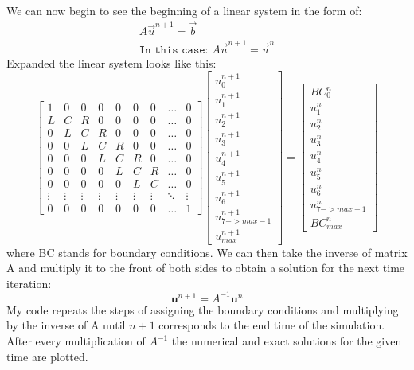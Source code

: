 \documentclass[12pt]{article}
\begin{document}
We can now begin to see the beginning of a linear system in the form of:
\begin{equation}
\begin{aligned}
A\vec{u}^{n+1}=\vec{b} \\
\texttt{In this case: } A\vec{u}^{n+1}=\vec{u}^n
\end{aligned}
\end{equation}
Expanded the linear system looks like this:
\[
\begin{bmatrix}
 1 & 0 & 0 & 0 & 0 & 0 & 0 & \dots & 0 \\
 L & C & R & 0 & 0 & 0 & 0 & \dots & 0 \\
 0 & L & C & R & 0 & 0 & 0 & \dots & 0 \\
 0 & 0 & L & C & R & 0 & 0 & \dots & 0 \\
 0 & 0 & 0 & L & C & R & 0 & \dots & 0 \\
 0 & 0 & 0 & 0 & L & C & R & \dots & 0 \\
 0 & 0 & 0 & 0 & 0 & L & C & \dots & 0 \\
 \vdots & \vdots & \vdots & \vdots & \vdots & \vdots & \vdots & \ddots & \vdots \\
 0 & 0 & 0 & 0 & 0 & 0 & 0 & \dots & 1 
\end{bmatrix}
\begin{bmatrix}
 u_0^{n+1} \\
 u_1^{n+1} \\
 u_2^{n+1} \\
 u_3^{n+1} \\
 u_4^{n+1} \\
 u_5^{n+1} \\
 u_6^{n+1} \\
 u_{7->max-1}^{n+1} \\
 u_{max}^{n+1} 
\end{bmatrix}
=
\begin{bmatrix}
 BC_0^{n} \\
 u_1^{n} \\
 u_2^{n} \\
 u_3^{n} \\
 u_4^{n} \\
 u_5^{n} \\
 u_6^{n} \\
 u_{7->max-1}^{n} \\
 BC_{max}^{n} 
\end{bmatrix}
\]
where BC stands for boundary conditions. We can then take the inverse of matrix A and multiply it to the front of both sides to obtain a solution for the next time iteration:
\begin{equation}
\textbf{u}^{n+1}=A^{-1}\textbf{u}^n
\end{equation}
My code repeats the steps of assigning the boundary conditions and multiplying by the inverse of A until $ n+1 $ corresponds to the end time of the simulation. After every multiplication of $A^{-1}$ the numerical and exact solutions for the given time are plotted.
\end{document}
